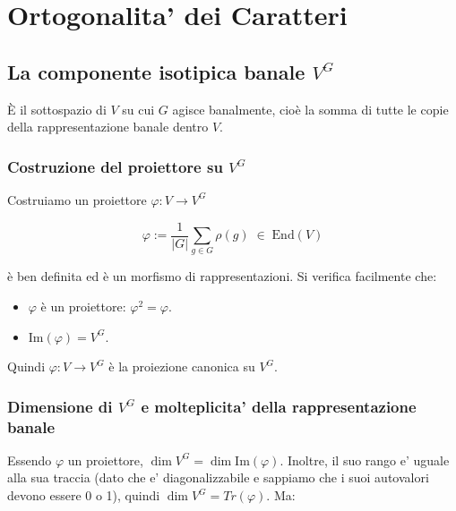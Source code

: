 
\section{Ortogonalita' dei Caratteri}
\subsection{La componente isotipica banale $ V^G $}

È il sottospazio di $V$ su cui $G$ agisce banalmente, cioè la somma di tutte le copie della rappresentazione banale dentro $V$.


  
\subsubsection{Costruzione del proiettore su $ V^G $}
Costruiamo un proiettore $ \varphi: V \to V^G $

$$\varphi := \frac{1}{|G|}\sum_{g \in G} \rho(g) \;\in\; \mathrm{End}(V)$$

è ben definita ed è un morfismo di rappresentazioni. Si verifica facilmente che:
\begin{itemize}
\item $\varphi$ è un proiettore: $\varphi^2 = \varphi$.
  \item $\mathrm{Im}(\varphi) = V^G$.
\end{itemize}
Quindi $\varphi: V \to V^G$ è la proiezione canonica su $V^G$.

\subsubsection{Dimensione di $ V^G $ e molteplicita' della rappresentazione banale}
Essendo $\varphi$ un proiettore, $\dim V^G = \dim \mathrm{Im}(\varphi)$. Inoltre, il suo rango e' uguale alla sua traccia (dato che e' diagonalizzabile e sappiamo che i suoi autovalori devono essere 0 o 1), quindi $ \dim V^G = Tr(\varphi) $. Ma:

